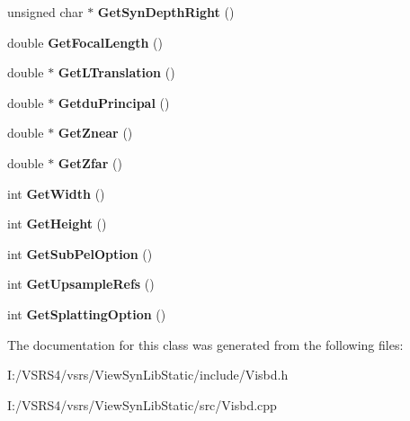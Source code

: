 \begin{DoxyCompactItemize}
unsigned char $\ast$ {\bfseries Get\+Syn\+Depth\+Right} ()
\item 
\mbox{\label{class_c_view_interpolation1_d_ac9366dcacc22212f0ee21418269362de}} 
double {\bfseries Get\+Focal\+Length} ()
\item 
\mbox{\label{class_c_view_interpolation1_d_a261175cda9d462b117dcaaf1a1bf34bb}} 
double $\ast$ {\bfseries Get\+L\+Translation} ()
\item 
\mbox{\label{class_c_view_interpolation1_d_a5a7d0d022d06b80ef5d6caa545633351}} 
double $\ast$ {\bfseries Getdu\+Principal} ()
\item 
\mbox{\label{class_c_view_interpolation1_d_a7f81015c33e3d2151ab8efc84154ad67}} 
double $\ast$ {\bfseries Get\+Znear} ()
\item 
\mbox{\label{class_c_view_interpolation1_d_a5747d0c19471c80c37fddc350715ac89}} 
double $\ast$ {\bfseries Get\+Zfar} ()
\item 
\mbox{\label{class_c_view_interpolation1_d_a700ced3774253ce23e597d43e253e86e}} 
int {\bfseries Get\+Width} ()
\item 
\mbox{\label{class_c_view_interpolation1_d_ab48543f380a8b02bec556f03d6182990}} 
int {\bfseries Get\+Height} ()
\item 
\mbox{\label{class_c_view_interpolation1_d_a747a28b2224ba9cd41deba2e7c1eaf8c}} 
int {\bfseries Get\+Sub\+Pel\+Option} ()
\item 
\mbox{\label{class_c_view_interpolation1_d_af18e3531ec912df1e32b1288a6231468}} 
int {\bfseries Get\+Upsample\+Refs} ()
\item 
\mbox{\label{class_c_view_interpolation1_d_ad76bd80fd8466b577fb6e5d928b5f7d9}} 
int {\bfseries Get\+Splatting\+Option} ()
\end{DoxyCompactItemize}


The documentation for this class was generated from the following files\+:\begin{DoxyCompactItemize}
\item 
I\+:/\+V\+S\+R\+S4/vsrs/\+View\+Syn\+Lib\+Static/include/Visbd.\+h\item 
I\+:/\+V\+S\+R\+S4/vsrs/\+View\+Syn\+Lib\+Static/src/Visbd.\+cpp\end{DoxyCompactItemize}
